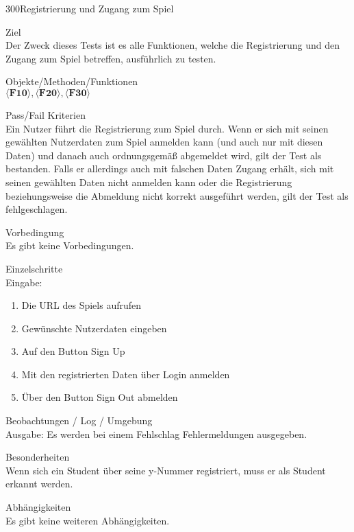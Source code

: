 \begin{testcase}{300}{Registrierung und Zugang zum Spiel}

\item[Ziel]~\\
Der Zweck dieses Tests ist es alle Funktionen, welche die Registrierung und den Zugang zum Spiel betreffen, ausführlich zu testen.

\item[Objekte/Methoden/Funktionen]~\\
$\langle\textbf{F10}\rangle, \langle\textbf{F20}\rangle, \langle\textbf{F30}\rangle$ 

\item[Pass/Fail Kriterien]~\\
Ein Nutzer führt die Registrierung zum Spiel durch. Wenn er sich mit seinen gewählten Nutzerdaten zum Spiel anmelden kann (und auch nur mit diesen Daten) und danach auch ordnungsgemäß abgemeldet wird, gilt der Test als bestanden. Falls er allerdings auch mit falschen Daten Zugang erhält, sich mit seinen gewählten Daten nicht anmelden kann oder die Registrierung beziehungsweise die Abmeldung nicht korrekt ausgeführt werden, gilt der Test als fehlgeschlagen.

\item[Vorbedingung]~\\
Es gibt keine Vorbedingungen.

\item[Einzelschritte]~\\

Eingabe:
\begin{enumerate}
\item Die URL des Spiels aufrufen
\item Gewünschte Nutzerdaten eingeben
\item Auf den Button \glqq Sign Up \grqq
\item Mit den registrierten Daten über \glqq Login \grqq anmelden 
\item Über den Button \glqq Sign Out \grqq abmelden
\end{enumerate}

\item[Beobachtungen / Log / Umgebung]~\\
Ausgabe:
Es werden bei einem Fehlschlag Fehlermeldungen ausgegeben.

\item[Besonderheiten]~\\
Wenn sich ein Student über seine y-Nummer registriert, muss er als Student erkannt werden.

\item[Abhängigkeiten]~\\
Es gibt keine weiteren Abhängigkeiten.

\end{testcase}

